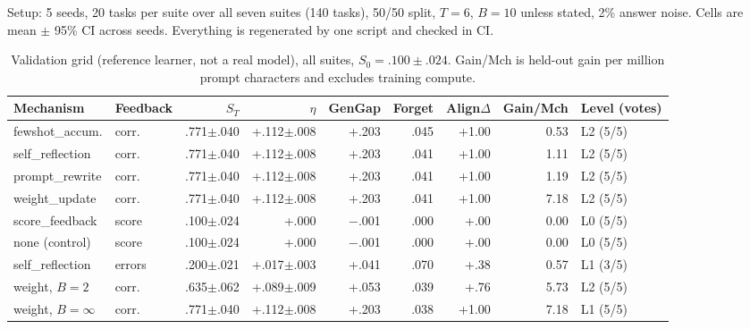 \documentclass[11pt]{article}
\begin{document}
Setup: 5 seeds, 20 tasks per suite over all seven suites (140 tasks), 50/50 split, $T{=}6$, $B{=}10$ unless stated, 2\% answer noise. Cells are mean $\pm$ 95\% CI across seeds. Everything is regenerated by one script and checked in CI.

\begin{table}[t]
\centering
\small
\setlength{\tabcolsep}{4pt}
\begin{tabular}{llrrrrrrl}
\toprule
Mechanism & Feedback & $S_T$ & $\eta$ & GenGap & Forget & Align$\Delta$ & Gain/Mch & Level (votes) \\
\midrule
fewshot\_accum. & corr. & .771$\pm$.040 & +.112$\pm$.008 & +.203 & .045 & +1.00 & 0.53 & L2 (5/5) \\
self\_reflection & corr. & .771$\pm$.040 & +.112$\pm$.008 & +.203 & .041 & +1.00 & 1.11 & L2 (5/5) \\
prompt\_rewrite & corr. & .771$\pm$.040 & +.112$\pm$.008 & +.203 & .041 & +1.00 & 1.19 & L2 (5/5) \\
weight\_update & corr. & .771$\pm$.040 & +.112$\pm$.008 & +.203 & .041 & +1.00 & 7.18 & L2 (5/5) \\
score\_feedback & score & .100$\pm$.024 & +.000 & $-$.001 & .000 & +.00 & 0.00 & L0 (5/5) \\
none (control) & score & .100$\pm$.024 & +.000 & $-$.001 & .000 & +.00 & 0.00 & L0 (5/5) \\
\midrule
self\_reflection & errors & .200$\pm$.021 & +.017$\pm$.003 & +.041 & .070 & +.38 & 0.57 & L1 (3/5) \\
weight, $B{=}2$ & corr. & .635$\pm$.062 & +.089$\pm$.009 & +.053 & .039 & +.76 & 5.73 & L2 (5/5) \\
weight, $B{=}\infty$ & corr. & .771$\pm$.040 & +.112$\pm$.008 & +.203 & .038 & +1.00 & 7.18 & L1 (5/5) \\
\bottomrule
\end{tabular}
\caption{Validation grid (reference learner, not a real model), all suites, $S_0 = .100 \pm .024$. Gain/Mch is held-out gain per million prompt characters and excludes training compute.}
\label{tab:main}
\end{table}
\end{document}
